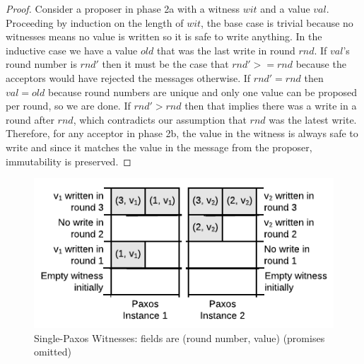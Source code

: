 \begin{proof}
Consider a proposer in phase 2a with a witness $wit$ and a value $val$.
Proceeding by induction on the length of $wit$, the base case is trivial because no witnesses
means no value is written so it is safe to write anything.
In the inductive case we have a value $old$ that was the last write in round $rnd$.
If $val$'s round number is $rnd'$ then it must be the case that $rnd' >= rnd$ because
the acceptors would have rejected the messages otherwise.
If $rnd' = rnd$ then $val = old$ because round numbers are unique and only one value can be proposed
per round, so we are done.
If $rnd' > rnd$ then that implies there was a write in a round after $rnd$, which contradicts our
assumption that $rnd$ was the latest write.
Therefore, for any acceptor in phase 2b, the value in the witness is always safe to write and since
it matches the value in the message from the proposer, immutability is preserved.
\end{proof}

\begin{figure}
\begin{center}
	\includegraphics[page=1]{figs/witnesspassing/witnessspmp}
\end{center}
	\vspace{-0.2in}
\caption{Single-Paxos Witnesses: fields are (round number, value) (promises omitted)}
\label{fig:paxos-witness-table}
\vspace{-1em}
\end{figure}

